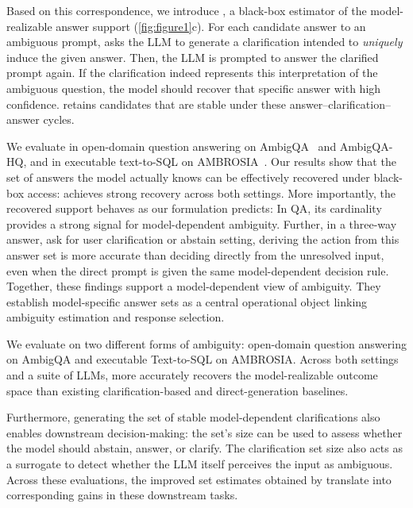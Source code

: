 Based on this correspondence, we introduce \circleclar{}, a black-box estimator of the model-realizable answer support (\cref{fig:figure1}c). For each candidate answer to an ambiguous prompt, \circleclar{} asks the LLM to generate a clarification intended to \textit{uniquely} induce the given answer. Then, the LLM is prompted to answer the clarified prompt again. If the clarification indeed represents this interpretation of the ambiguous question, the model should recover that specific answer with high confidence. \circleclar{} retains candidates that are stable under these answer--clarification--answer cycles. 

We evaluate \circleclar{} in open-domain question answering on AmbigQA~\citep{min-etal-2020-ambigqa} and AmbigQA-HQ, and in executable text-to-SQL on AMBROSIA~\citep{NEURIPS2024_a4c942a8}. 
Our results show that the set of answers the model actually knows can be effectively recovered under black-box access: \circleclar{} achieves strong recovery across both settings. 
More importantly, the recovered support behaves as our formulation predicts: In QA, its cardinality provides a strong signal for model-dependent ambiguity. 
Further, in a three-way answer, ask for user clarification or abstain setting, deriving the action from this answer set is more accurate than deciding directly from the unresolved input,
even when the direct prompt is given the same model-dependent decision rule. Together, these findings support a model-dependent view of ambiguity. They establish model-specific answer sets as a central operational object linking ambiguity estimation and response selection.
\fi



\iffalse
We evaluate \circleclar{} on two different forms of ambiguity: open-domain question answering on AmbigQA and executable Text-to-SQL on AMBROSIA. Across both settings and a suite of LLMs, \circleclar{} more accurately recovers the model-realizable outcome space than existing clarification-based and direct-generation baselines. 

Furthermore, generating the set of stable model-dependent clarifications also enables downstream decision-making: the set's size can be used to assess whether the model should abstain, answer, or clarify. The clarification set size also acts as a surrogate to detect whether the LLM itself perceives the input as ambiguous. Across these evaluations, the improved set estimates obtained by \circleclar{} translate into corresponding gains in these downstream tasks.



